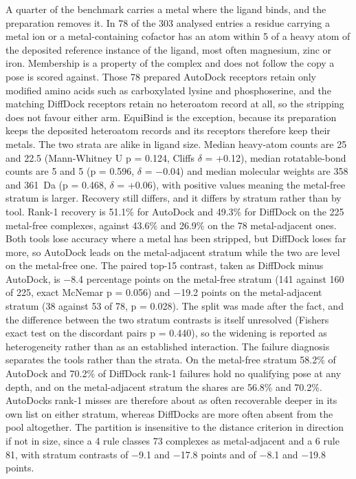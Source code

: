 A quarter of the benchmark carries a metal where the ligand binds, and the preparation removes it. In 78 of the 303 analysed entries a residue carrying a metal ion or a metal-containing cofactor has an atom within 5\angstrom{} of a heavy atom of the deposited reference instance of the ligand, most often magnesium, zinc or iron. Membership is a property of the complex and does not follow the copy a pose is scored against. Those 78 prepared AutoDock receptors retain only modified amino acids such as carboxylated lysine and phosphoserine, and the matching DiffDock receptors retain no heteroatom record at all, so the stripping does not favour either arm. EquiBind is the exception, because its preparation keeps the deposited heteroatom records and its receptors therefore keep their metals. The two strata are alike in ligand size. Median heavy-atom counts are 25 and 22.5 (Mann-Whitney U p = 0.124, Cliff\textquotesingle s \ensuremath{\delta} = +0.12), median rotatable-bond counts are 5 and 5 (p = 0.596, \ensuremath{\delta} = \ensuremath{-}0.04) and median molecular weights are 358 and 361~Da (p = 0.468, \ensuremath{\delta} = +0.06), with positive values meaning the metal-free stratum is larger. Recovery still differs, and it differs by stratum rather than by tool. Rank-1 recovery is 51.1\% for AutoDock and 49.3\% for DiffDock on the 225 metal-free complexes, against 43.6\% and 26.9\% on the 78 metal-adjacent ones. Both tools lose accuracy where a metal has been stripped, but DiffDock loses far more, so AutoDock leads on the metal-adjacent stratum while the two are level on the metal-free one. The paired top-15 contrast, taken as DiffDock minus AutoDock, is \ensuremath{-}8.4 percentage points on the metal-free stratum (141 against 160 of 225, exact McNemar p = 0.056) and \ensuremath{-}19.2 points on the metal-adjacent stratum (38 against 53 of 78, p = 0.028). The split was made after the fact, and the difference between the two stratum contrasts is itself unresolved (Fisher\textquotesingle s exact test on the discordant pairs p = 0.440), so the widening is reported as heterogeneity rather than as an established interaction. The failure diagnosis separates the tools rather than the strata. On the metal-free stratum 58.2\% of AutoDock and 70.2\% of DiffDock rank-1 failures hold no qualifying pose at any depth, and on the metal-adjacent stratum the shares are 56.8\% and 70.2\%. AutoDock\textquotesingle s rank-1 misses are therefore about as often recoverable deeper in its own list on either stratum, whereas DiffDock\textquotesingle s are more often absent from the pool altogether. The partition is insensitive to the distance criterion in direction if not in size, since a 4\angstrom{} rule classes 73 complexes as metal-adjacent and a 6\angstrom{} rule 81, with stratum contrasts of \ensuremath{-}9.1 and \ensuremath{-}17.8 points and of \ensuremath{-}8.1 and \ensuremath{-}19.8 points.

